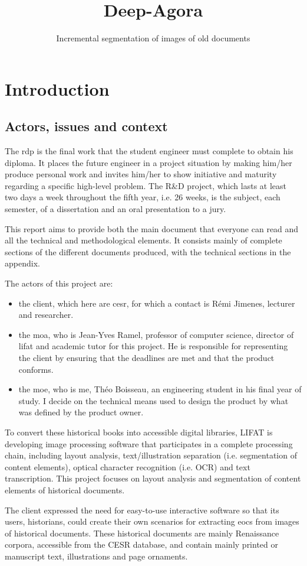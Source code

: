 \documentclass{polytech/polytech}
\title{Deep-Agora}
\subtitle{Incremental segmentation of images of old documents}
\numberwithin{figure}{chapter}
\begin{document}
             
\chapter{Introduction}
\section{Actors, issues and context}

The \gls{rdp} is the final work that the student engineer must complete to obtain his diploma.
It places the future engineer in a project situation by making him/her produce personal work and invites him/her to show initiative and maturity regarding a specific high-level problem.
The R\&D project, which lasts at least two days a week throughout the fifth year, i.e. 26 weeks, is the subject, each semester, of a dissertation and an oral presentation to a jury.

This report aims to provide both the main document that everyone can read and all the technical and methodological elements.
It consists mainly of complete sections of the different documents produced, with the technical sections in the appendix.

The actors of this project are:
\begin{itemize}
\item the client, which here are \gls{cesr}, for which a contact is Rémi Jimenes, lecturer and researcher.
\item the \gls{moa}, who is Jean-Yves Ramel, professor of computer science, director of \gls{lifat} and academic tutor for this project. He is responsible for representing the client by ensuring that the deadlines are met and that the product conforms.
\item the \gls{moe}, who is me, Théo Boisseau, an engineering student in his final year of study. I decide on the technical means used to design the product by what was defined by the product owner.
\end{itemize}

To convert these historical books into accessible digital libraries, LIFAT is developing image processing software that participates in a complete processing chain, including layout analysis, text/illustration separation (i.e. segmentation of content elements), optical character recognition (i.e. OCR) and text transcription.
This project focuses on layout analysis and segmentation of content elements of historical documents.

The client expressed the need for easy-to-use interactive software so that its users, historians, could create their own scenarios for extracting \gls{eocs} from images of historical documents. These historical documents are mainly Renaissance corpora, accessible from the CESR database, and contain mainly printed or manuscript text, illustrations and page ornaments.
\end{document}
